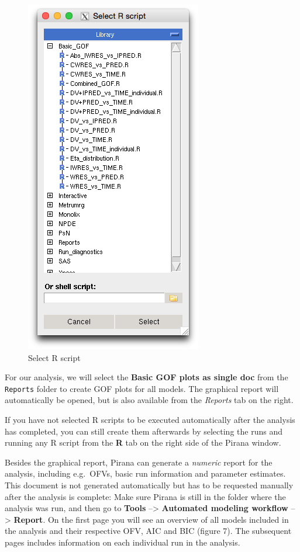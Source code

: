 \begin{figure}[htbp]
\centering
\includegraphics[scale=0.5]{images/run_r.png}
\caption{Select R script}
\end{figure}

For our analysis, we will select the \textbf{Basic GOF plots as single
doc} from the \texttt{Reports} folder to create GOF plots for all
models. The graphical report will automatically be opened, but is also
available from the \emph{Reports} tab on the right.

If you have not selected R scripts to be executed automatically after
the analysis has completed, you can still create them afterwards by
selecting the runs and running any R script from the \textbf{R} tab on
the right side of the Pirana window.

Besides the graphical report, Pirana can generate a \emph{numeric}
report for the analysis, including e.g.~OFVs, basic run information and
parameter estimates. This document is not generated automatically but
has to be requested manually after the analysis is complete: Make sure
Pirana is still in the folder where the analysis was run, and then go to
\textbf{Tools} --\textgreater{} \textbf{Automated modeling workflow}
--\textgreater{} \textbf{Report}. On the first page you will see an
overview of all models included in the analysis and their respective
OFV, AIC and BIC (figure 7). The subsequent pages includes information
on each individual run in the analysis.

